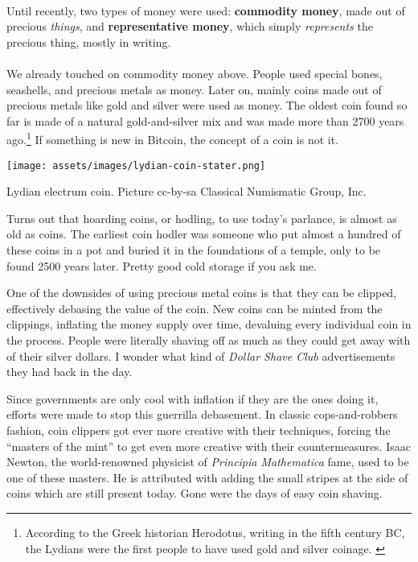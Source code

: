 \paragraph{}
Until recently, two types of money were used: \textbf{commodity money}, made
out of precious \textit{things}, and \textbf{representative money}, which simply
\textit{represents} the precious thing, mostly in writing.

\paragraph{}
We already touched on commodity money above. People used special bones,
seashells, and precious metals as money. Later on, mainly coins made out of
precious metals like gold and silver were used as money. The oldest coin found
so far is made of a natural gold-and-silver mix and was made more than 2700
years ago.\footnote{According to the Greek historian Herodotus, writing in the
fifth century BC, the Lydians were the first people to have used gold and silver
coinage. \cite{coinage-origins}} If something is new in Bitcoin, the concept of
a coin is not it.

\newpage

\begin{center}
  \centering
  \texttt{[image: assets/images/lydian-coin-stater.png]}
  \caption{Lydian electrum coin. Picture cc-by-sa Classical Numismatic Group, Inc.}
  \label{fig:lydian-coin-stater}
\end{center}

Turns out that hoarding coins, or hodling, to use today's parlance, is
almost as old as coins. The earliest coin hodler was someone who put
almost a hundred of these coins in a pot and buried it in the
foundations of a temple, only to be found 2500 years later. Pretty good
cold storage if you ask me.

One of the downsides of using precious metal coins is that they can be
clipped, effectively debasing the value of the coin. New coins can be
minted from the clippings, inflating the money supply over time,
devaluing every individual coin in the process. People were literally
shaving off as much as they could get away with of their silver dollars.
I wonder what kind of \textit{Dollar Shave Club} advertisements they had back
in the day.

Since governments are only cool with inflation if they are the ones
doing it, efforts were made to stop this guerrilla debasement. In
classic cops-and-robbers fashion, coin clippers got ever more creative
with their techniques, forcing the \enquote{masters of the mint} to get even
more creative with their countermeasures. Isaac Newton, the
world-renowned physicist of \textit{Principia Mathematica} fame, used to be one
of these masters. He is attributed with adding the small stripes at the
side of coins which are still present today. Gone were the days of easy
coin shaving.

